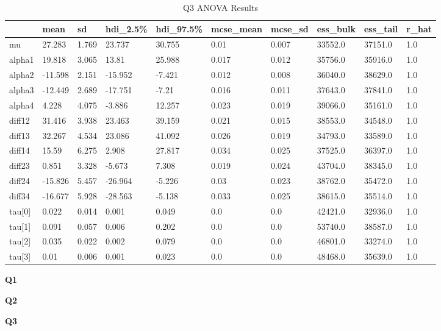 \documentclass{homeworg}
\begin{document}
\begin{table}[H]
	\caption{Q3 ANOVA Results}
	\begin{tabular}{llllllllll}
		\hline \hline
		& mean    & sd    & hdi\_2.5\% & hdi\_97.5\% & mcse\_mean & mcse\_sd & ess\_bulk & ess\_tail & r\_hat \\ \hline
		mu         & 27.283  & 1.769 & 23.737     & 30.755      & 0.01       & 0.007    & 33552.0   & 37151.0   & 1.0    \\
		alpha1     & 19.818  & 3.065 & 13.81      & 25.988      & 0.017      & 0.012    & 35756.0   & 35916.0   & 1.0    \\
		alpha2     & -11.598 & 2.151 & -15.952    & -7.421      & 0.012      & 0.008    & 36040.0   & 38629.0   & 1.0    \\
		alpha3     & -12.449 & 2.689 & -17.751    & -7.21       & 0.016      & 0.011    & 37643.0   & 37841.0   & 1.0    \\
		alpha4     & 4.228   & 4.075 & -3.886     & 12.257      & 0.023      & 0.019    & 39066.0   & 35161.0   & 1.0    \\
		diff12     & 31.416  & 3.938 & 23.463     & 39.159      & 0.021      & 0.015    & 38553.0   & 34548.0   & 1.0    \\
		diff13     & 32.267  & 4.534 & 23.086     & 41.092      & 0.026      & 0.019    & 34793.0   & 33589.0   & 1.0    \\
		diff14     & 15.59   & 6.275 & 2.908      & 27.817      & 0.034      & 0.025    & 37525.0   & 36397.0   & 1.0    \\
		diff23     & 0.851   & 3.328 & -5.673     & 7.308       & 0.019      & 0.024    & 43704.0   & 38345.0   & 1.0    \\
		diff24     & -15.826 & 5.457 & -26.964    & -5.226      & 0.03       & 0.023    & 38762.0   & 35472.0   & 1.0    \\
		diff34     & -16.677 & 5.928 & -28.563    & -5.138      & 0.033      & 0.025    & 38615.0   & 35514.0   & 1.0    \\
		tau{[}0{]} & 0.022   & 0.014 & 0.001      & 0.049       & 0.0        & 0.0      & 42421.0   & 32936.0   & 1.0    \\
		tau{[}1{]} & 0.091   & 0.057 & 0.006      & 0.202       & 0.0        & 0.0      & 53740.0   & 38587.0   & 1.0    \\
		tau{[}2{]} & 0.035   & 0.022 & 0.002      & 0.079       & 0.0        & 0.0      & 46801.0   & 33274.0   & 1.0    \\
		tau{[}3{]} & 0.01    & 0.006 & 0.001      & 0.023       & 0.0        & 0.0      & 48468.0   & 35639.0   & 1.0      \\ \hline \hline
	\end{tabular}
\end{table}


%
%

\newpage
\textbf{Q1}

\newpage
\textbf{Q2}

\newpage
\textbf{Q3}

%
\end{document}
